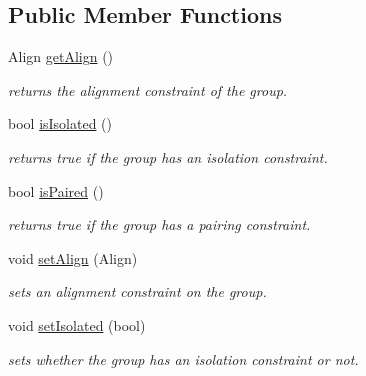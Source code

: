 \subsection*{Public Member Functions}
\begin{DoxyCompactItemize}
\item 
\mbox{\label{class_open_chams_1_1_group_a7cff0c4a6957f23fb1ea4598f4b8a0b8}} 
Align \hyperlink{class_open_chams_1_1_group_a7cff0c4a6957f23fb1ea4598f4b8a0b8}{get\+Align} ()
\begin{DoxyCompactList}\small\item\em returns the alignment constraint of the group. \end{DoxyCompactList}\item 
\mbox{\label{class_open_chams_1_1_group_ab5ae4a4550c418c974ff6e59967eeec2}} 
bool \hyperlink{class_open_chams_1_1_group_ab5ae4a4550c418c974ff6e59967eeec2}{is\+Isolated} ()
\begin{DoxyCompactList}\small\item\em returns true if the group has an isolation constraint. \end{DoxyCompactList}\item 
\mbox{\label{class_open_chams_1_1_group_aee0abf07a6e9d41f511c648e6eaecea3}} 
bool \hyperlink{class_open_chams_1_1_group_aee0abf07a6e9d41f511c648e6eaecea3}{is\+Paired} ()
\begin{DoxyCompactList}\small\item\em returns true if the group has a pairing constraint. \end{DoxyCompactList}\item 
void \hyperlink{class_open_chams_1_1_group_a9fc27b2bc4da99c723102153c4fbf1c0}{set\+Align} (Align)
\begin{DoxyCompactList}\small\item\em sets an alignment constraint on the group. \end{DoxyCompactList}\item 
void \hyperlink{class_open_chams_1_1_group_abefcd8ede34b508fe7d42428a618cb02}{set\+Isolated} (bool)
\begin{DoxyCompactList}\small\item\em sets whether the group has an isolation constraint or not. \end{DoxyCompactList}\item 

\end{DoxyCompactItemize}
